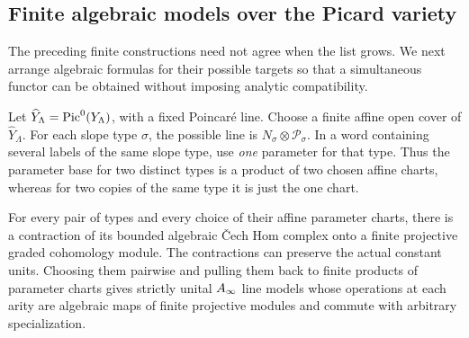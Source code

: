 \subsection{Finite algebraic models over the Picard variety}

The preceding finite constructions need not agree when the list
grows.  We next arrange algebraic formulas for their possible targets
so that a simultaneous functor can be obtained without imposing
analytic compatibility.

Let $\widehat Y_\Lambda=\operatorname{Pic}^0(Y_\Lambda)$, with a fixed Poincar\'e
line.  Choose a finite affine open cover of $\widehat Y_\Lambda$.
For each slope type $\sigma$, the possible line is
$N_\sigma\otimes\mathcal P_\sigma$.  In a word containing several
labels of the same slope type, use \emph{one} parameter for that type.
Thus the parameter base for two distinct types is a product of two
chosen affine charts, whereas for two copies of the same type it is
just the one chart.

\begin{lemma}
\label{mirror:parameter-model}
For every pair of types and every choice of their affine parameter
charts, there is a contraction of its bounded algebraic \v Cech Hom
complex onto a finite projective graded cohomology module.  The
contractions can preserve the actual constant units.  Choosing them
pairwise and pulling them back to finite products of parameter
charts gives strictly unital $A_\infty$ line models whose operations at
each arity are algebraic maps of finite projective modules and
commute with arbitrary specialization.
\end{lemma}

